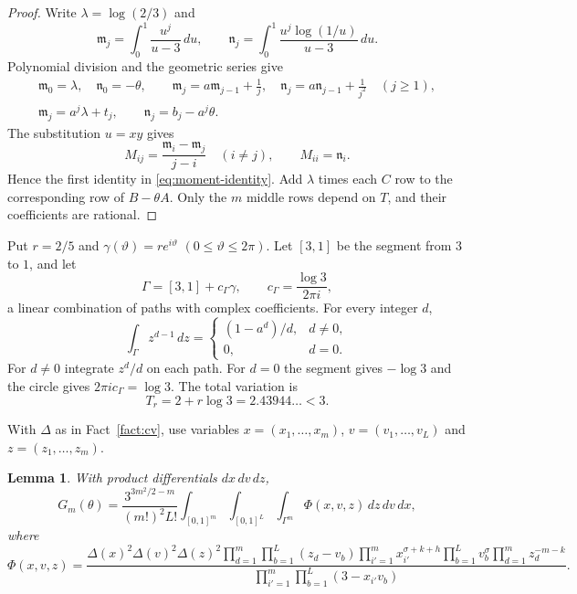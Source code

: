\documentclass{amsart}
\newtheorem{lemma}{Lemma}[section]
\numberwithin{equation}{section}
\numberwithin{table}{section}
\begin{document}
\begin{proof}
Write $\lambda=\log(2/3)$ and
\[
\mathfrak m_j=\int_0^1\frac{u^j}{u-3}\,du,\qquad
\mathfrak n_j=\int_0^1\frac{u^j\log(1/u)}{u-3}\,du.
\]
Polynomial division and the geometric series give
\begin{equation*}
\begin{gathered}
\mathfrak m_0=\lambda,\quad \mathfrak n_0=-\theta,\qquad
\mathfrak m_j=a\mathfrak m_{j-1}+\frac1j,\quad
\mathfrak n_j=a\mathfrak n_{j-1}+\frac1{j^2}\quad(j\ge1),\\
\mathfrak m_j=a^j\lambda+t_j,\qquad \mathfrak n_j=b_j-a^j\theta.
\end{gathered}
\end{equation*}
The substitution $u=xy$ gives
\[
M_{ij}=\frac{\mathfrak m_i-\mathfrak m_j}{j-i}\quad(i\ne j),\qquad M_{ii}=\mathfrak n_i.
\]
Hence the first identity in \eqref{eq:moment-identity}. Add $\lambda$
times each $C$ row to the corresponding row of $B-\theta A$. Only the $m$
middle rows depend on $T$, and their coefficients are rational.
\end{proof}

Put $r=2/5$ and $\gamma(\vartheta)=re^{i\vartheta}$ $(0\le\vartheta\le2\pi)$.
Let $[3,1]$ be the segment from $3$ to $1$, and let
\begin{equation*}
\Gamma=[3,1]+c_\Gamma\gamma,\qquad c_\Gamma=\frac{\log3}{2\pi i},
\end{equation*}
a linear combination of paths with complex coefficients. For every integer $d$,
\begin{equation}\label{eq:laurent-moments}
\int_\Gamma z^{d-1}\,dz=
\begin{cases}
(1-a^d)/d,&d\ne0,\\
0,&d=0.
\end{cases}
\end{equation}
For $d\ne0$ integrate $z^d/d$ on each path. For $d=0$ the segment
gives $-\log3$ and the circle gives $2\pi ic_\Gamma=\log3$. The total variation is
\begin{equation}\label{eq:chain-variation}
T_r=2+r\log3=2.43944\ldots<3.
\end{equation}

With $\Delta$ as in Fact~\ref{fact:cv}, use variables
$x=(x_1,\ldots,x_m)$, $v=(v_1,\ldots,v_L)$ and $z=(z_1,\ldots,z_m)$.

\begin{lemma}\label{lem:integral-identity}
With product differentials $dx\,dv\,dz$,
\begin{equation}\label{eq:integral-identity}
G_m(\theta)=
\frac{3^{3m^2/2-m}}{(m!)^2L!}
\int_{[0,1]^m}\int_{[0,1]^L}\int_{\Gamma^m}
 \Phi(x,v,z)\,dz\,dv\,dx,
\end{equation}
where
\begin{equation*}
\Phi(x,v,z)=
\frac{\Delta(x)^2\Delta(v)^2\Delta(z)^2
\displaystyle\prod_{d=1}^{m}\prod_{b=1}^{L}(z_d-v_b)
\displaystyle\prod_{i'=1}^{m}x_{i'}^{\sigma+k+h}
\prod_{b=1}^{L}v_b^\sigma\prod_{d=1}^{m}z_d^{-m-k}}
{\displaystyle\prod_{i'=1}^{m}\prod_{b=1}^{L}(3-x_{i'}v_b)}.
\end{equation*}
\end{lemma}
\end{document}
